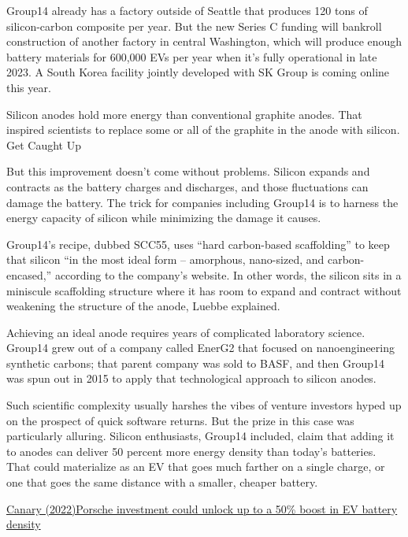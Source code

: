 \documentclass[
]{book}
\begin{document}
Group14 already has a factory outside of Seattle that produces 120 tons of silicon-carbon composite per year. But the new Series C funding will bankroll construction of another factory in central Washington, which will produce enough battery materials for 600,000 EVs per year when it's fully operational in late 2023. A South Korea facility jointly developed with SK Group is coming online this year.

Silicon anodes hold more energy than conventional graphite anodes. That inspired scientists to replace some or all of the graphite in the anode with silicon.
Get Caught Up

But this improvement doesn't come without problems. Silicon expands and contracts as the battery charges and discharges, and those fluctuations can damage the battery. The trick for companies including Group14 is to harness the energy capacity of silicon while minimizing the damage it causes.

Group14's recipe, dubbed SCC55, uses \hspace{0pt}``hard carbon-based scaffolding'' to keep that silicon \hspace{0pt}``in the most ideal form -- amorphous, nano-sized, and carbon-encased,'' according to the company's website. In other words, the silicon sits in a miniscule scaffolding structure where it has room to expand and contract without weakening the structure of the anode, Luebbe explained.

Achieving an ideal anode requires years of complicated laboratory science. Group14 grew out of a company called EnerG2 that focused on nanoengineering synthetic carbons; that parent company was sold to BASF, and then Group14 was spun out in 2015 to apply that technological approach to silicon anodes.

Such scientific complexity usually harshes the vibes of venture investors hyped up on the prospect of quick software returns. But the prize in this case was particularly alluring. Silicon enthusiasts, Group14 included, claim that adding it to anodes can deliver 50 percent more energy density than today's batteries. That could materialize as an EV that goes much farther on a single charge, or one that goes the same distance with a smaller, cheaper battery.

\href{https://www.canarymedia.com/articles/electric-vehicles/porsche-investment-could-unlock-a-25-boost-in-ev-battery-density}{Canary (2022)Porsche investment could unlock up to a 50\% boost in EV battery density}
\end{document}
